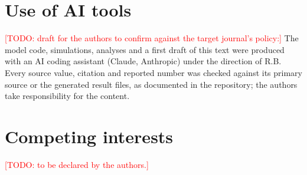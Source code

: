 \documentclass[11pt]{article}
\newcommand{\todo}[1]{\textcolor{red}{[TODO: #1]}}
\begin{document}
\section*{Use of AI tools}
\todo{draft for the authors to confirm against the target journal's policy:} The model code, simulations, analyses
and a first draft of this text were produced with an AI coding assistant (Claude, Anthropic) under the direction of
R.B. Every source value, citation and reported number was checked against its primary source or the generated result
files, as documented in the repository; the authors take responsibility for the content.

\section*{Competing interests}
\todo{to be declared by the authors.}



\end{document}
